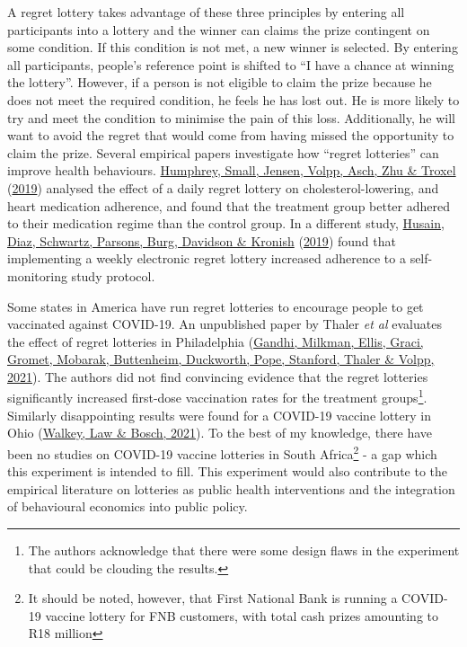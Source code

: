 \documentclass[11pt,preprint, authoryear]{elsarticle}
\numberwithin{equation}{section}
\numberwithin{figure}{section}
\numberwithin{table}{section}
\let\rmarkdownfootnote\footnote%
\def\footnote{\protect\rmarkdownfootnote}
\begin{document}
A regret lottery takes advantage of these three principles by entering
all participants into a lottery and the winner can claims the prize
contingent on some condition. If this condition is not met, a new winner
is selected. By entering all participants, people's reference point is
shifted to ``I have a chance at winning the lottery''. However, if a
person is not eligible to claim the prize because he does not meet the
required condition, he feels he has lost out. He is more likely to try
and meet the condition to minimise the pain of this loss. Additionally,
he will want to avoid the regret that would come from having missed the
opportunity to claim the prize. Several empirical papers investigate how
``regret lotteries'' can improve health behaviours.
\protect\hyperlink{ref-adhere}{Humphrey, Small, Jensen, Volpp, Asch, Zhu
\& Troxel} (\protect\hyperlink{ref-adhere}{2019}) analysed the effect of
a daily regret lottery on cholesterol-lowering, and heart medication
adherence, and found that the treatment group better adhered to their
medication regime than the control group. In a different study,
\protect\hyperlink{ref-regr}{Husain, Diaz, Schwartz, Parsons, Burg,
Davidson \& Kronish} (\protect\hyperlink{ref-regr}{2019}) found that
implementing a weekly electronic regret lottery increased adherence to a
self-monitoring study protocol.

Some states in America have run regret lotteries to encourage people to
get vaccinated against COVID-19. An unpublished paper by Thaler \emph{et
al} evaluates the effect of regret lotteries in Philadelphia
(\protect\hyperlink{ref-duck}{Gandhi, Milkman, Ellis, Graci, Gromet,
Mobarak, Buttenheim, Duckworth, Pope, Stanford, Thaler \& Volpp, 2021}).
The authors did not find convincing evidence that the regret lotteries
significantly increased first-dose vaccination rates for the treatment
groups\footnote{The authors acknowledge that there were some design
  flaws in the experiment that could be clouding the results.}.
Similarly disappointing results were found for a COVID-19 vaccine
lottery in Ohio (\protect\hyperlink{ref-ohio}{Walkey, Law \& Bosch,
2021}). To the best of my knowledge, there have been no studies on
COVID-19 vaccine lotteries in South Africa\footnote{It should be noted,
  however, that First National Bank is running a COVID-19 vaccine
  lottery for FNB customers, with total cash prizes amounting to R18
  million} - a gap which this experiment is intended to fill. This
experiment would also contribute to the empirical literature on
lotteries as public health interventions and the integration of
behavioural economics into public policy.
\end{document}
